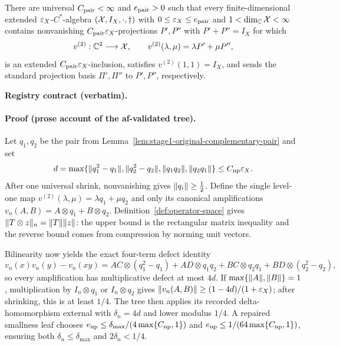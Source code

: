 \begin{lemma}\label{lem:stage1-fresh-two-point-inclusion}
There are universal $C_{\rm pair}<\infty$ and $e_{\rm pair}>0$ such that every
finite-dimensional extended $\varepsilon_X$-$C^*$-algebra $(\mathcal X,I_X,\cdot,\dagger)$ with
$0\le\varepsilon_X\le e_{\rm pair}$ and $1<\dim_{\mathbb C}\mathcal X<\infty$ contains nonvanishing
$C_{\rm pair}\varepsilon_X$-projections $P',P''$ with $P'+P''=I_X$ for which
\[
 v^{(2)}:\mathbb C^2\longrightarrow\mathcal X,\qquad
 v^{(2)}(\lambda,\mu)=\lambda P'+\mu P'',
\]
is an extended $C_{\rm pair}\varepsilon_X$-inclusion, satisfies $v^{(2)}(1,1)=I_X$, and sends
the standard projection basis $\Pi',\Pi''$ to $P',P''$, respectively.
\end{lemma}

\noindent\textbf{Registry contract (verbatim).} 

\paragraph{Proof (prose account of the af-validated tree).}
Let $q_1,q_2$ be the pair from Lemma~\ref{lem:stage1-original-complementary-pair} and set
\[
 d=\max\{\lVert q_1^2-q_1\rVert,\lVert q_2^2-q_2\rVert,\lVert q_1q_2\rVert,\lVert q_2q_1\rVert\}
 \le C_{\rm np}\varepsilon_X.
\]
After one universal shrink, nonvanishing gives $\lVert q_i\rVert\ge\tfrac12$.  Define the single
level-one map $v^{(2)}(\lambda,\mu)=\lambda q_1+\mu q_2$ and only its canonical
amplifications $v_n(A,B)=A\otimes q_1+B\otimes q_2$.  Definition~\ref{def:operator-space}
gives $\lVert T\otimes z\rVert_n=\lVert T\rVert\lVert z\rVert$: the upper bound is the rectangular matrix
inequality and the reverse bound comes from compression by norming unit vectors.

Bilinearity now yields the exact four-term defect identity
\[
 v_n(x)v_n(y)-v_n(xy)=AC\otimes(q_1^2-q_1)+AD\otimes q_1q_2
 +BC\otimes q_2q_1+BD\otimes(q_2^2-q_2),
\]
so every amplification has multiplicative defect at most $4d$.  If
$\max\{\lVert A\rVert,\lVert B\rVert\}=1$, multiplication by $I_n\otimes q_1$ or
$I_n\otimes q_2$ gives
$\lVert v_n(A,B)\rVert\ge(1-4d)/(1+\varepsilon_X)$; after shrinking, this is at least $1/4$.
The tree then applies its recorded delta-homomorphism external with
$\delta_n=4d$ and lower modulus $1/4$.  A repaired smallness leaf chooses
$e_{\rm up}\le\delta_{\max}/(4\max\{C_{\rm np},1\})$ and
$e_{\rm up}\le1/(64\max\{C_{\rm np},1\})$, ensuring both
$\delta_n\le\delta_{\max}$ and $2\delta_n<1/4$.

